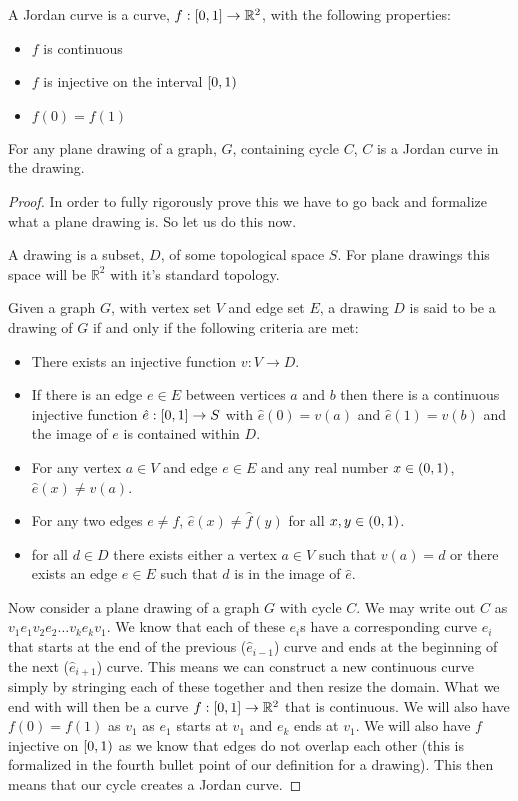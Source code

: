 \documentclass{article}
\begin{document}
\begin{definition}
	A Jordan curve is a curve, $f:\left[ {0} , {1} \right]\to \mathbb R^2$, with the following properties:
	\begin{itemize}
		\item $f$ is continuous
		\item $f$ is injective on the interval $\left[ {0} , {1} \right)$
		\item $f(0) = f(1)$
	\end{itemize}
\end{definition}
\begin{lemma}
	For any plane drawing of a graph, $G$, containing cycle $C$, $C$ is a Jordan curve in the drawing.
\end{lemma}
\begin{proof}
	In order to fully rigorously prove this we have to go back and formalize what a plane drawing is. So let us do this now.
	
	A drawing is a subset, $D$, of some topological space $S$. For plane drawings this space will be $\mathbb R^2$ with it's standard topology.
	
	Given a graph $G$, with vertex set $V$ and edge set $E$, a drawing $D$ is said to be a drawing of $G$ if and only if the following criteria are met:
	\begin{itemize}
		\item There exists an injective function $v:V\to D$.
		\item If there is an edge $e\in E$ between vertices $a$ and $b$ then there is a continuous injective function $\hat e:\left[ {0} , {1} \right]\to S$ with $\hat e(0) = v(a)$ and $\hat e(1) = v(b)$ and the image of $e$ is contained within $D$.
		\item For any vertex $a\in V$ and edge $e\in E$ and any real number $x\in\left( {0} , {1} \right)$, $\hat e(x)\not=v(a)$.
		\item For any two edges $e\not=f$, $\hat e(x) \not= \hat f(y)$ for all $x,y \in\left( {0} , {1} \right)$.
		\item for all $d\in D$ there exists either a vertex $a\in V$ such that $v(a) = d$ or there exists an edge $e\in E$ such that $d$ is in the image of $\hat e$.
	\end{itemize}

	Now consider a plane drawing of a graph $G$ with cycle $C$. We may write out $C$ as $v_1e_1v_2e_2\ldots v_ke_kv_1$. We know that each of these $e_i$s have a corresponding curve $\hat e_i$ that starts at the end of the previous ($\hat e_{i-1}$) curve and ends at the beginning of the next ($\hat e_{i+1}$) curve. This means we can construct a new continuous curve simply by stringing each of these together and then resize the domain. What we end with will then be a curve $f:\left[ {0} , {1} \right]\to\mathbb R^2$ that is continuous. We will also have $f(0) = f(1)$ as $v_1$ as $e_1$ starts at $v_1$ and $e_k$ ends at $v_1$. We will also have $f$ injective on $\left[ {0} , {1} \right)$ as we know that edges do not overlap each other (this is formalized in the fourth bullet point of our definition for a drawing). This then means that our cycle creates a Jordan curve.
\end{proof}
\end{document}
